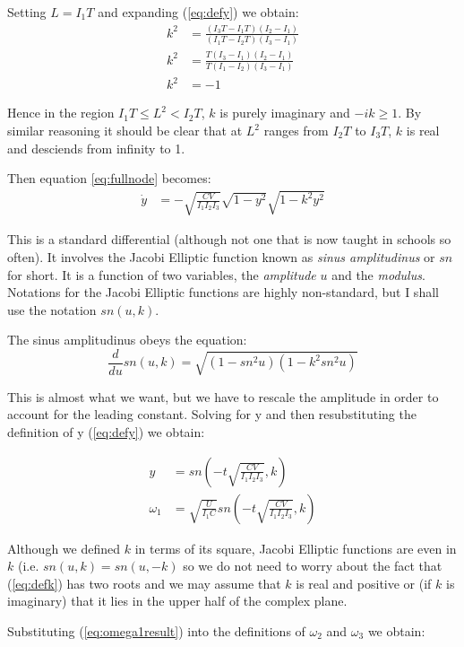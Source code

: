 \documentclass[a4paper, 12pt]{article}
\begin{document}
Setting $L=I_1T$ and expanding (\ref{eq:defy}) we obtain:
\begin{align}
  k^2 &= \frac{(I_3T - I_1T)(I_2 - I_1)}{(I_1T - I_2T)(I_3 - I_1)} \\
  k^2 & = \frac{T(I_3 - I_1)(I_2 - I_1)}{T(I_1 - I_2)(I_3 - I_1)} \\
  k^2 & = -1
\end{align}

Hence in the region $I_1T\le L^2 < I_2T$, $k$ is purely imaginary and $-ik\ge 1$. By similar reasoning it should be clear that at $L^2$ ranges from $I_2T$ to $I_3T$, $k$ is real and desciends from infinity to 1.

Then equation \ref{eq:fullnode} becomes:
\begin{align}
  \dot{y}&=-\sqrt{\frac{CV}{I_1I_2I_3}}\sqrt{1-y^2}\sqrt{1-k^2y^2}
\end{align}

This is a standard differential (although not one that is now taught in schools so often). It involves the Jacobi Elliptic function known as {\it sinus amplitudinus} or $sn$ for short. It is a function of two variables, the {\it amplitude} $u$ and the {\it modulus}. Notations for the Jacobi Elliptic functions are highly non-standard, but I shall use the notation $sn(u, k)$.

The sinus amplitudinus obeys the equation:
\begin{equation}
  \frac{d}{du}sn(u, k)=\sqrt{(1 - sn^2u)(1 - k^2 sn^2 u)}
\end{equation}

This is almost what we want, but we have to rescale the amplitude in order to account for the leading constant. Solving for y and then resubstituting the definition of y (\ref{eq:defy}) we obtain:

\begin{align}
  y &= sn(-t\sqrt{\frac{CV}{I_1I_2I_3}}, k) \\
  \omega_1 &= \sqrt{\frac{U}{I_1C}}sn(-t\sqrt{\frac{CV}{I_1I_2I_3}}, k) \label{eq:omega1result}
\end{align}

Although we defined $k$ in terms of its square, Jacobi Elliptic functions are even in $k$ (i.e. $sn(u, k) = sn(u, -k)$ so we do not need to worry about the fact that (\ref{eq:defk}) has two roots and we may assume that $k$ is real and positive or (if $k$ is imaginary) that it lies in the upper half of the complex plane.



Substituting (\ref{eq:omega1result}) into the definitions of $\omega_2$ and $\omega_3$ we obtain:
\end{document}
